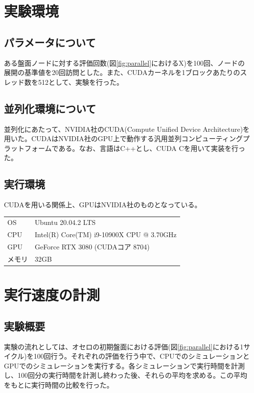 \documentclass[10pt, a4paper]{jsarticle}
\begin{document}
\section{実験環境}
\subsection{パラメータについて}
ある盤面ノードに対する評価回数(図\ref{fig:parallel}におけるX)を100回、ノードの展開の基準値を20回訪問とした。また、CUDAカーネルを1ブロックあたりのスレッド数を512として、実験を行った。
\subsection{並列化環境について}
並列化にあたって、NVIDIA社のCUDA(Compute Unified Device Architecture)を用いた。CUDAはNVIDIA社のGPU上で動作する汎用並列コンピューティングプラットフォームである。なお、言語はC++とし、CUDA Cを用いて実装を行った。
\subsection{実行環境}
CUDAを用いる関係上、GPUはNVIDIA社のものとなっている。
\begin{table}[ht]
    \begin{center}
        \begin{tabular}{ll}
            OS & Ubuntu 20.04.2 LTS \\
            CPU & Intel(R) Core(TM) i9-10900X CPU @ 3.70GHz \\
            GPU & GeForce RTX 3080 (CUDAコア 8704)\\
            メモリ & 32GB \\
        \end{tabular}
    \end{center}
\end{table}
\section{実行速度の計測}
\subsection{実験概要}
実験の流れとしては、オセロの初期盤面における評価(図\ref{fig:parallel}における1サイクル)を100回行う。それぞれの評価を行う中で、CPUでのシミュレーションとGPUでのシミュレーションを実行する。各シミュレーションで実行時間を計測し、100回分の実行時間を計測し終わった後、それらの平均を求める。この平均をもとに実行時間の比較を行った。
\end{document}
